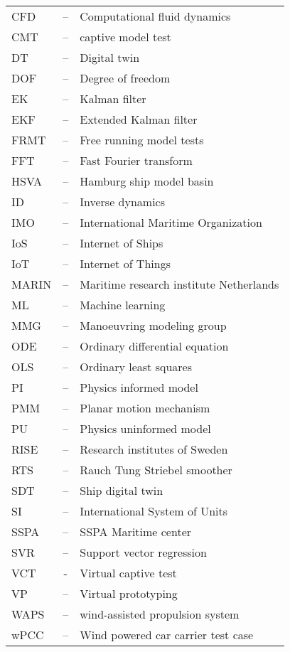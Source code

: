 
\begin{tabular}{ l c l }
CFD & -- & Computational fluid dynamics\\
CMT & -- & captive model test \\
DT  & -- & Digital twin\\
DOF & -- & Degree of freedom\\
EK & -- & Kalman filter \\
EKF & -- & Extended Kalman filter \\
FRMT & -- & Free running model tests \\
FFT & -- & Fast Fourier transform\\
HSVA & -- & Hamburg ship model basin \\
ID & -- & Inverse dynamics \\
IMO & -- & International Maritime Organization \\
IoS & -- & Internet of Ships \\
IoT & -- & Internet of Things \\
MARIN & -- & Maritime research institute Netherlands \\
ML & -- & Machine learning \\
MMG & -- & Manoeuvring modeling group \\
ODE & -- & Ordinary differential equation\\
OLS & -- & Ordinary least squares\\
PI & -- & Physics informed model \\ 
PMM & -- & Planar motion mechanism \\ 
PU & -- & Physics uninformed model \\
RISE & -- & Research institutes of Sweden \\
RTS & -- & Rauch Tung Striebel smoother \\
SDT  & -- & Ship digital twin\\
SI  & -- & International System of Units\\
SSPA & -- & SSPA Maritime center \\
SVR & -- & Support vector regression \\
VCT & - & Virtual captive test \\
VP & -- & Virtual prototyping \\
WAPS & -- & wind-assisted propulsion system\\
wPCC & -- & Wind powered car carrier test case\\
\end{tabular}

